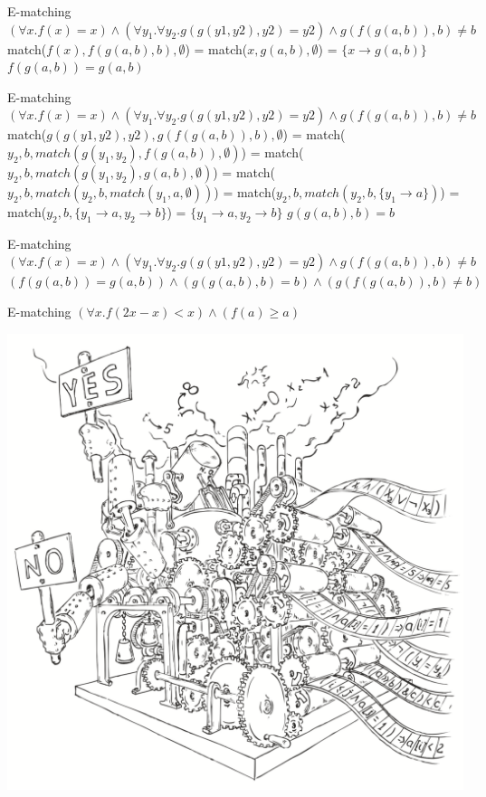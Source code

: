 \documentclass{beamer}
\begin{document}
\begin{frame}{E-matching}
$(\forall x.f(x) = x) \wedge (\forall y_1 .\forall y_2 .g(g(y1, y2), y2) = y2) \wedge g(f(g(a, b)), b) \neq b$\newline
match($f(x), f(g(a, b), b), \emptyset$) =\newline
match($x, g(a, b), \emptyset$) =\newline
$\{x \rightarrow g(a, b)\}$\newline
$f(g(a, b)) = g(a, b)$
\end{frame}

\begin{frame}{E-matching}
$(\forall x.f(x) = x) \wedge (\forall y_1 .\forall y_2 .g(g(y1, y2), y2) = y2) \wedge g(f(g(a, b)), b) \neq b$\newline
match($g(g(y1, y2), y2), g(f(g(a, b)), b), \emptyset$)
= match($y_2, b, match(g(y_1, y_2 ), f(g(a, b)), \emptyset)$)
= match($y_2, b, match(g(y_1, y_2 ), g(a, b), \emptyset)$)
= match($y_2, b, match(y_2, b, match(y_1 , a, \emptyset))$)
= match($y_2, b, match(y_2, b, \{y_1 \rightarrow a\})$)
= match($y_2, b, \{y_1 \rightarrow a, y_2 \rightarrow b\}$)
= $\{y_1 \rightarrow a, y_2 \rightarrow b\}$\newline
$g(g(a, b), b) = b$\newline
\end{frame}
\begin{frame}{E-matching}
$(\forall x.f(x) = x) \wedge (\forall y_1 .\forall y_2 .g(g(y1, y2), y2) = y2) \wedge g(f(g(a, b)), b) \neq b$\newline
$(f(g(a, b)) = g(a, b)) \wedge (g(g(a, b), b) = b) \wedge (g(f(g(a, b)), b) \neq b)$\newline
\end{frame}

\begin{frame}{E-matching}
$(\forall x.f(2x - x) < x) \wedge (f (a) \ge a)$\newline
\end{frame}

\begin{frame}
\includegraphics[scale=0.5]{../decision-procedure.png}
\end{frame}
\end{document}
